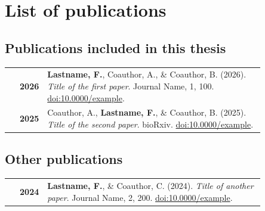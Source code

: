 \section*{List of publications}

\subsection*{Publications included in this thesis}

\begin{tabular}{>{\footnotesize\bfseries}r >{\footnotesize}p{0.85\linewidth}}

	2026 & \textbf{Lastname, F.}, Coauthor, A., \& Coauthor, B. (2026).
	\emph{Title of the first paper}.
	Journal Name, 1, 100.
	\href{https://doi.org/10.0000/example}{doi:10.0000/example}. \\[0.8em]

	2025 & Coauthor, A., \textbf{Lastname, F.}, \& Coauthor, B. (2025).
	\emph{Title of the second paper}.
	bioRxiv.
	\href{https://doi.org/10.0000/example}{doi:10.0000/example}. \\[0.8em]

\end{tabular}

\vspace{1.2em}

\subsection*{Other publications}

\begin{tabular}{>{\footnotesize\bfseries}r >{\footnotesize}p{0.85\linewidth}}

	2024 & \textbf{Lastname, F.}, \& Coauthor, C. (2024).
	\emph{Title of another paper}.
	Journal Name, 2, 200.
	\href{https://doi.org/10.0000/example}{doi:10.0000/example}. \\[0.8em]

\end{tabular}
